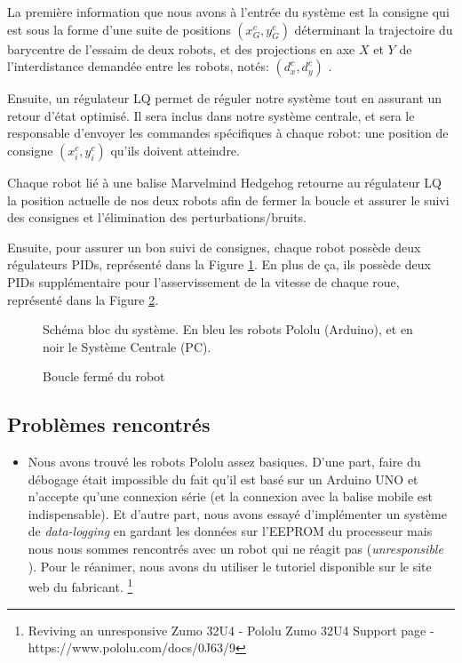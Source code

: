 La première information que nous avons à l'entrée du système est la consigne qui est sous la forme d'une suite de positions $(x^c_G,y^c_G)$ déterminant la trajectoire du barycentre de l'essaim de deux robots, et des projections en axe $X$ et $Y$ de l'interdistance demandée entre les robots, notés: $(d^c_x,d^c_y)$ .

Ensuite, un régulateur LQ permet de réguler notre système tout en assurant un retour d'état optimisé. Il sera inclus dans notre système centrale, et sera le responsable d'envoyer les commandes spécifiques à chaque robot: une position de consigne $(x^c_i,y^c_i)$ qu'ils doivent atteindre. 

Chaque robot lié à une balise Marvelmind Hedgehog retourne au régulateur LQ la position actuelle de nos deux robots afin de fermer la boucle et assurer le suivi des consignes et l'élimination des perturbations/bruits.

Ensuite, pour assurer un bon suivi de consignes, chaque robot possède deux régulateurs PIDs, représenté dans la Figure \ref{fig:robot}. En plus de ça, ils possède deux PIDs supplémentaire pour l'asservissement de la vitesse de chaque roue, représenté dans la Figure \ref{fig:robot_pid}. 

\begin{figure}[h!]
    \centering
    
    \caption{Schéma bloc du système. En bleu les robots Pololu (Arduino), et en noir le Système Centrale (PC).}
    \label{fig:robot}
\end{figure}

\begin{figure}[h!]
    \centering
    
    \caption{Boucle fermé du robot}
    \label{fig:robot_pid}
\end{figure}

\subsection{Problèmes rencontrés}
\begin{itemize}
    \item Nous avons trouvé les robots Pololu assez basiques. D'une part, faire du débogage était impossible du fait qu'il est basé sur un Arduino UNO et n'accepte qu'une connexion série (et la connexion avec la balise mobile est indispensable). Et d'autre part, nous avons essayé d'implémenter un système de \og \textit{data-logging} \fg{} en gardant les données sur l'EEPROM du processeur mais nous nous sommes rencontrés avec un robot qui ne réagit pas (\og \textit{unresponsible} \fg{}). Pour le réanimer, nous avons du utiliser le tutoriel disponible sur le site web du fabricant. \footnote{Reviving an unresponsive Zumo 32U4 - Pololu Zumo 32U4 Support page - https://www.pololu.com/docs/0J63/9}
\end{itemize}
\clearpage

